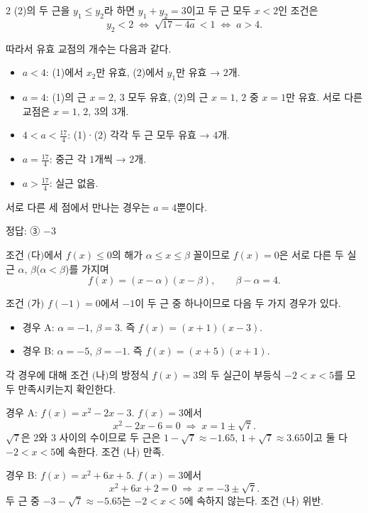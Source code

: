 \documentclass[10pt]{article}
\begin{document}
\begin{multicols}{2}
(2)의 두 근을 $y_1 \le y_2$라 하면 $y_1 + y_2 = 3$이고 두 근 모두 $x < 2$인 조건은
\[ y_2 < 2 \;\Longleftrightarrow\; \sqrt{17 - 4a} < 1 \;\Longleftrightarrow\; a > 4. \]

따라서 유효 교점의 개수는 다음과 같다.
\begin{itemize}
\item $a < 4$: (1)에서 $x_2$만 유효, (2)에서 $y_1$만 유효 → $2$개.
\item $a = 4$: (1)의 근 $x = 2,\, 3$ 모두 유효, (2)의 근 $x = 1,\, 2$ 중 $x = 1$만 유효. 서로 다른 교점은 $x = 1,\, 2,\, 3$의 $3$개.
\item $4 < a < \tfrac{17}{4}$: (1)·(2) 각각 두 근 모두 유효 → $4$개.
\item $a = \tfrac{17}{4}$: 중근 각 $1$개씩 → $2$개.
\item $a > \tfrac{17}{4}$: 실근 없음.
\end{itemize}

서로 다른 세 점에서 만나는 경우는 $a = 4$뿐이다.

\begin{answerbox}정답: ③ $-3$\end{answerbox}

조건 $(\!$다$)$에서 $f(x) \le 0$의 해가 $\alpha \le x \le \beta$ 꼴이므로 $f(x) = 0$은 서로 다른 두 실근 $\alpha$, $\beta$($\alpha < \beta$)를 가지며
\[ f(x) = (x - \alpha)(x - \beta),\qquad \beta - \alpha = 4. \]

조건 $(\!$가$)$ $f(-1) = 0$에서 $-1$이 두 근 중 하나이므로 다음 두 가지 경우가 있다.
\begin{itemize}
\item 경우 A: $\alpha = -1$, $\beta = 3$. 즉 $f(x) = (x + 1)(x - 3)$.
\item 경우 B: $\alpha = -5$, $\beta = -1$. 즉 $f(x) = (x + 5)(x + 1)$.
\end{itemize}

각 경우에 대해 조건 $(\!$나$)$의 방정식 $f(x) = 3$의 두 실근이 부등식 $-2 < x < 5$를 모두 만족시키는지 확인한다.

경우 A: $f(x) = x^2 - 2x - 3$. $f(x) = 3$에서
\[ x^2 - 2x - 6 = 0 \;\Longrightarrow\; x = 1 \pm \sqrt{7}. \]
$\sqrt{7}$은 $2$와 $3$ 사이의 수이므로 두 근은 $1 - \sqrt{7} \approx -1.65$, $1 + \sqrt{7} \approx 3.65$이고 둘 다 $-2 < x < 5$에 속한다. 조건 $(\!$나$)$ 만족.

경우 B: $f(x) = x^2 + 6x + 5$. $f(x) = 3$에서
\[ x^2 + 6x + 2 = 0 \;\Longrightarrow\; x = -3 \pm \sqrt{7}. \]
두 근 중 $-3 - \sqrt{7} \approx -5.65$는 $-2 < x < 5$에 속하지 않는다. 조건 $(\!$나$)$ 위반.


\end{multicols}
\end{document}
